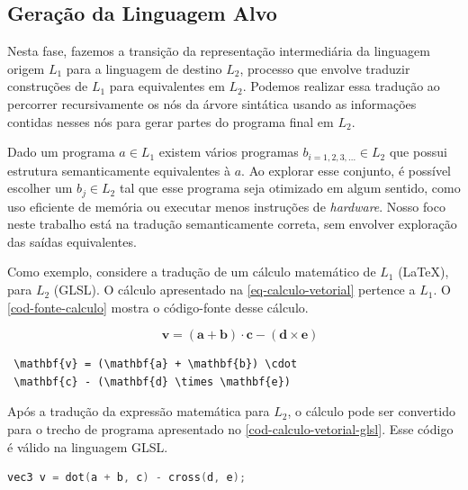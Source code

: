 \documentclass[english,
               brazil,
               bsc] %
               {dcomp-abntex2}
\begin{document}
\subsection{Geração da Linguagem Alvo} \label{codegen}


Nesta fase, fazemos a transição da representação intermediária  da linguagem origem \( L_1 \)  para  a linguagem de destino \( L_2 \), processo que envolve traduzir construções de \( L_1 \) para equivalentes em $L_2$. Podemos realizar essa tradução ao percorrer recursivamente os nós da árvore sintática usando as informações contidas nesses nós para gerar partes do programa final em $L_2$.


Dado um programa $a \in L_1$ existem vários programas $b_{i=1,2,3,...} \in L_2$ que possui estrutura semanticamente equivalentes à $a$. Ao explorar esse conjunto, é possível escolher um $b_j \in L_2$ tal que esse programa seja otimizado em algum sentido, como uso eficiente de memória ou executar menos instruções de \textit{hardware}. Nosso foco neste trabalho está na tradução semanticamente correta, sem envolver exploração das saídas  equivalentes.


Como exemplo, considere a tradução de um cálculo matemático de \( L_1 \) (\LaTeX{}), para \( L_2 \) (GLSL). O cálculo apresentado na \autoref{eq-calculo-vetorial} pertence a $L_1$. O \autoref{cod-fonte-calculo} mostra o código-fonte desse cálculo. 




\begin{equation} \label{eq-calculo-vetorial}
 \quad \mathbf{v} = (\mathbf{a} + \mathbf{b}) \cdot
 \mathbf{c} - (\mathbf{d} \times \mathbf{e})
\end{equation}


\begin{codigo}
  \caption{\small Cálculo vetorial em código-fonte \LaTeX{}.}
  \label{cod-fonte-calculo}
\begin{lstlisting}
 \mathbf{v} = (\mathbf{a} + \mathbf{b}) \cdot
 \mathbf{c} - (\mathbf{d} \times \mathbf{e})
\end{lstlisting}
\end{codigo}






Após a tradução da expressão matemática para \( L_2 \), o cálculo pode ser convertido para o trecho de programa apresentado no \autoref{cod-calculo-vetorial-glsl}. Esse código é válido na linguagem GLSL.


\begin{codigo}
\caption{\small Cálculo vetorial em código GLSL.}
\label{cod-calculo-vetorial-glsl}
\begin{lstlisting}[language = C]
    vec3 v = dot(a + b, c) - cross(d, e);
\end{lstlisting}
\end{codigo}
\end{document}

